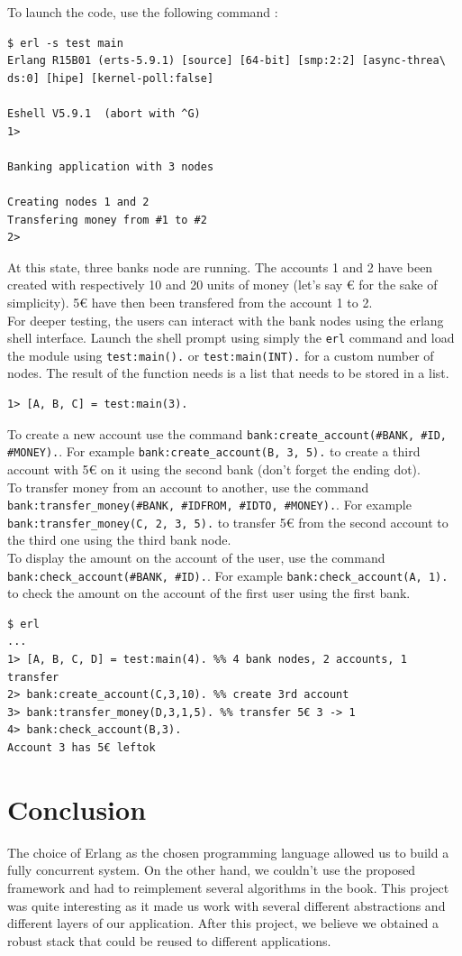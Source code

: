 \documentclass[11pt,english,a4paper]{article}
\begin{document}
To launch the code, use the following command :
\begin{verbatim}
$ erl -s test main
Erlang R15B01 (erts-5.9.1) [source] [64-bit] [smp:2:2] [async-threa\
ds:0] [hipe] [kernel-poll:false]

Eshell V5.9.1  (abort with ^G)
1>

Banking application with 3 nodes

Creating nodes 1 and 2
Transfering money from #1 to #2
2>
\end{verbatim}
At this state, three banks node are running.
The accounts 1 and 2 have been created with respectively 10 and 20 units of money (let's say € for the sake of simplicity).
5€ have then been transfered from the account 1 to 2.\\

For deeper testing, the users can interact with the bank nodes using the erlang shell interface.
Launch the shell prompt using simply the \texttt{erl} command and load the module using \texttt{test:main().} or \texttt{test:main(INT).} for a custom number of nodes.
The result of the function needs is a list that needs to be stored in a list.
\begin{verbatim}
1> [A, B, C] = test:main(3).
\end{verbatim}

To create a new account use the command \texttt{bank:create\_account(\#BANK, \#ID, \#MONEY).}.
For example \texttt{bank:create\_account(B, 3, 5).} to create a third account with 5€ on it using the second bank (don't forget the ending dot).\\

To transfer money from an account to another, use the command  \texttt{bank:transfer\_money(\#BANK, \#IDFROM, \#IDTO, \#MONEY).}.
For example \texttt{bank:transfer\_money(C, 2, 3, 5).} to transfer 5€ from the second account to the third one using the third bank node.\\

To display the amount on the account of the user, use the command  \texttt{bank:check\_account(\#BANK, \#ID).}.
For example \texttt{bank:check\_account(A, 1).} to check the amount on the account of the first user using the first bank.\\

\begin{verbatim}
$ erl
...
1> [A, B, C, D] = test:main(4). %% 4 bank nodes, 2 accounts, 1 transfer
2> bank:create_account(C,3,10). %% create 3rd account
3> bank:transfer_money(D,3,1,5). %% transfer 5€ 3 -> 1
4> bank:check_account(B,3).
Account 3 has 5€ leftok
\end{verbatim}

\section{Conclusion}
The choice of Erlang as the chosen programming language allowed us to build a fully concurrent system.
On the other hand, we couldn't use the proposed framework and had to reimplement several algorithms in the book.
This project was quite interesting as it made us work with several different abstractions and different layers of our application.
After this project, we believe we obtained a robust stack that could be reused to different applications.
\end{document}
